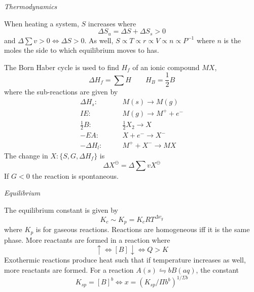 \documentclass[10pt]{extarticle}
\begin{document}
\begin{multicols*}{2}


{\Large\textit{Thermodynamics}}
\bigskip

When heating a system, $S$ increases where \begin{equation}
  \Delta S_u = \Delta S + \Delta S_s > 0
\end{equation}
and $\Delta \sum v > 0 \iff \Delta S > 0$. As well, $S \propto T \propto r \propto V \propto n \propto P^{-1}$ where $n$ is the moles the side to which equilibrium moves to has.

\bigskip
The Born Haber cycle is used to find $H_f$ of an ionic compound $MX$,
\begin{equation}
  \Delta H_f = \textstyle\sum H \qquad H_B = \textstyle\frac{1}{2} B
\end{equation}
where the sub-reactions are given by
\begin{align}
  \Delta H_s: \qquad & M(s) \to M(g) \nonumber\\
  IE: \qquad & M(g) \to M^+ + e^- \nonumber\\
  \textstyle\frac{1}{2} B: \qquad & \textstyle\frac{1}{2} X_2 \to X \\
  -EA: \qquad & X + e^- \to X^- \nonumber\\
  - \Delta H_l: \qquad & M^+ + X^- \to MX \nonumber
\end{align}
The change in $X : \{ S, G, \Delta H_f \}$ is
\begin{equation}
  \Delta X^\ominus = \Delta \textstyle\sum v X^\ominus
\end{equation}
If $G < 0$ the reaction is spontaneous.


\vspace{7mm}
{\Large\textit{Equilibrium}}
\bigskip

The equilibrium constant is given by \begin{equation}
  K_c \sim K_p = K_c RT^{\Delta v_g}
\end{equation}
where $K_p$ is for gaseous reactions. Reactions are homogeneous iff it is the same phase. More reactants are formed in a reaction where
\begin{equation}
  [A] \uparrow \iff [B] \downarrow \iff Q > K
\end{equation}
Exothermic reactions produce heat such that if temperature increases as well, more reactants are formed. For a reaction $A(s) \leftrightharpoons bB(aq)$, the constant
\begin{equation}
  K_{sp} = [B]^b \iff x = (K_{sp}/\Pi b^b)^{1/\Sigma b}
\end{equation}


\end{multicols*}
\end{document}
